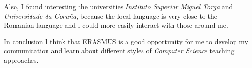 \documentclass[22]{letter}
\begin{document}
\begin{letter}{  }
  Also, I found interesting the universities \textit{Instituto Superior Miguel Torga} and \textit{Universidade da Coru\~ na}, because the local language is very close to the \\Romanian language and I could more easily interact with those around me.
  
  In conclusion I think that ERASMUS is a good opportunity for me to develop my communication and learn about different styles of \textit{Computer Science} teaching approaches.
  
  

\end{letter}
 
 
\end{document}
